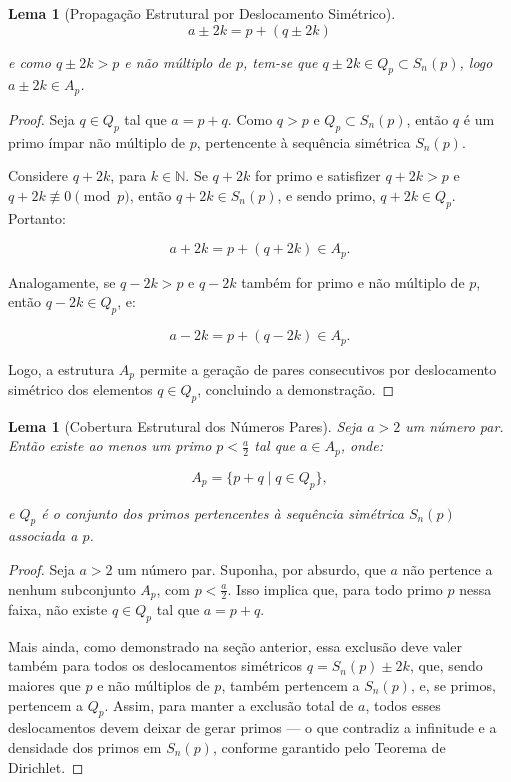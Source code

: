 \documentclass[a4paper,11pt]{article}
\newtheorem{lemma}[theorem]{Lema}
\theoremstyle{definition}
\theoremstyle{remark}
\begin{document}
\begin{otherlanguage}{brazil}
\begin{lemma}[Propagação Estrutural por Deslocamento Simétrico]
		\[
		a \pm 2k = p + (q \pm 2k)
		\]
		
		e como \(q \pm 2k > p\) e não múltiplo de \(p\), tem-se que \(q \pm 2k \in Q_p \subset S_n(p)\), logo \(a \pm 2k \in A_p\).
	\end{lemma}
	
	\begin{proof}
		Seja \(q \in Q_p\) tal que \(a = p + q\). Como \(q > p\) e \(Q_p \subset S_n(p)\), então \(q\) é um primo ímpar não múltiplo de \(p\), pertencente à sequência simétrica \(S_n(p)\).
		
		Considere \(q + 2k\), para \(k \in \mathbb{N}\). Se \(q + 2k\) for primo e satisfizer \(q + 2k > p\) e \(q + 2k \not\equiv 0 \pmod{p}\), então \(q + 2k \in S_n(p)\), e sendo primo, \(q + 2k \in Q_p\). Portanto:
		
		\[
		a + 2k = p + (q + 2k) \in A_p.
		\]
		
		Analogamente, se \(q - 2k > p\) e \(q - 2k\) também for primo e não múltiplo de \(p\), então \(q - 2k \in Q_p\), e:
		
		\[
		a - 2k = p + (q - 2k) \in A_p.
		\]
		
		Logo, a estrutura \(A_p\) permite a geração de pares consecutivos por deslocamento simétrico dos elementos \(q \in Q_p\), concluindo a demonstração.
	\end{proof}
	
	\begin{lemma}[Cobertura Estrutural dos Números Pares]\label{lema:cobertura_dos_pares}
		Seja \(a > 2\) um número par. Então existe ao menos um primo \(p < \frac{a}{2}\) tal que \(a \in A_p\), onde:
		
		\[
		A_p = \{p + q \mid q \in Q_p\},
		\]
		
		e \(Q_p\) é o conjunto dos primos pertencentes à sequência simétrica \(S_n(p)\) associada a \(p\).
	\end{lemma}
	
	\begin{proof}
		Seja \(a > 2\) um número par. Suponha, por absurdo, que \(a\) não pertence a nenhum subconjunto \(A_p\), com \(p < \frac{a}{2}\). Isso implica que, para todo primo \(p\) nessa faixa, não existe \(q \in Q_p\) tal que \(a = p + q\).
		
		Mais ainda, como demonstrado na seção anterior, essa exclusão deve valer também para todos os deslocamentos simétricos \(q = S_n(p) \pm 2k\), que, sendo maiores que \(p\) e não múltiplos de \(p\), também pertencem a \(S_n(p)\), e, se primos, pertencem a \(Q_p\). Assim, para manter a exclusão total de \(a\), todos esses deslocamentos devem deixar de gerar primos — o que contradiz a infinitude e a densidade dos primos em \(S_n(p)\), conforme garantido pelo Teorema de Dirichlet.
		

\end{proof}
\end{otherlanguage}
\end{document}
